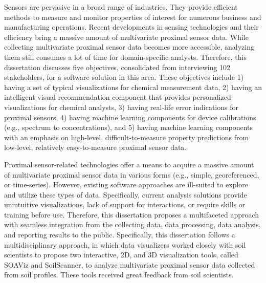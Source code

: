\newcommand{\soaviz}{SOAViz}
\newcommand{\soilscanner}{SoilScanner}
\newcommand{\idvs}{iDVS}
\newcommand{\outliagnostics}{Outliagnostics}
\newcommand{\outliag}{Outliagnostics}
\newcommand{\mtsad}{MTSAD}
\newcommand{\loo}{leave-one-out}
\newcommand{\Loo}{Leave-one-out}



Sensors are pervasive in a broad range of industries. They provide efficient methods to measure and monitor properties of interest for numerous business and manufacturing operations. Recent developments in sensing technologies and their efficiency bring a massive amount of multivariate proximal sensor data. While collecting multivariate proximal sensor data becomes more accessible, analyzing them still consumes a lot of time for domain-specific analysts. Therefore, this dissertation discusses five objectives, consolidated from interviewing 102 stakeholders, for a software solution in this area. These objectives include 1) having a set of typical visualizations for chemical measurement data, 2) having an intelligent visual recommendation component that provides personalized visualizations for chemical analysts, 3) having real-life error indications for proximal sensors, 4) having machine learning components for device calibrations (e.g., spectrum to concentrations), and 5) having machine learning components with an emphasis on high-level, difficult-to-measure property predictions from low-level, relatively easy-to-measure proximal sensor data. 


Proximal sensor-related technologies offer a means to acquire a massive amount of multivariate proximal sensor data in various forms (e.g., simple, georeferenced, or time-series). However, existing software approaches are ill-suited to explore and utilize these types of data. Specifically, current analysis solutions provide unintuitive visualizations, lack of support for interactions, or require skills or training before use. Therefore, this dissertation proposes a multifaceted approach with seamless integration from the collecting data, data processing, data analysis, and reporting results to the public. Specifically, this dissertation follows a multidisciplinary approach, in which data visualizers worked closely with soil scientists to propose two interactive, 2D, and 3D visualization tools, called \soaviz{} and \soilscanner{}, to analyze multivariate proximal sensor data collected from soil profiles. These tools received great feedback from soil scientists.


